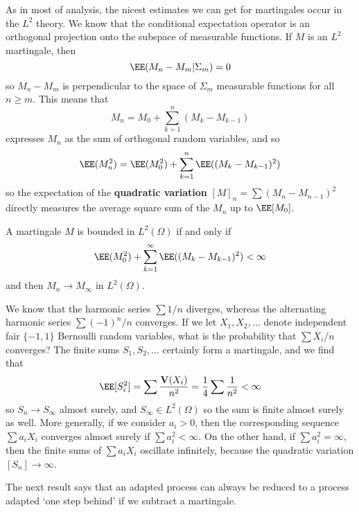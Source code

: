 As in most of analysis, the nicest estimates we can get for martingales occur in the $L^2$ theory. We know that the conditional expectation operator is an orthogonal projection onto the subspace of measurable functions. If $M$ is an $L^2$ martingale, then
%
\[ \EE(M_n - M_m | \Sigma_m) = 0 \]
%
so $M_n - M_m$ is perpendicular to the space of $\Sigma_m$ measurable functions for all $n \geq m$. This means that
%
\[ M_n = M_0 + \sum_{k = 1}^n (M_k - M_{k-1}) \]
%
expresses $M_n$ as the sum of orthogonal random variables, and so
%
\[ \EE(M_n^2) = \EE(M_0^2) + \sum_{k = 1}^n \EE((M_k - M_{k-1})^2) \]
%
so the expectation of the {\bf quadratic variation} $[M]_n = \sum (M_n - M_{n-1})^2$ directly measures the average square sum of the $M_n$ up to $\EE[M_0]$.

\begin{theorem}
    A martingale $M$ is bounded in $L^2(\Omega)$ if and only if
    \[ \EE(M_0^2) + \sum_{k = 1}^\infty \EE((M_k - M_{k-1})^2) < \infty \]
    and then $M_n \to M_\infty$ in $L^2(\Omega)$.
\end{theorem}

\begin{example}
    We know that the harmonic series $\sum 1/n$ diverges, whereas the alternating harmonic series $\sum (-1)^n/n$ converges. If we let $X_1, X_2, \dots$ denote independent fair $\{ -1, 1 \}$ Bernoulli random variables, what is the probability that $\sum X_i/n$ converges? The finite sums $S_1, S_2, \dots$ certainly form a martingale, and we find that
    \[ \EE[S_i^2] = \sum \frac{\mathbf{V}(X_i)}{n^2} = \frac{1}{4} \sum \frac{1}{n^2} < \infty \]
    so $S_n \to S_\infty$ almost surely, and $S_\infty \in L^2(\Omega)$ so the sum is finite almost surely as well. More generally, if we consider $a_i > 0$, then the corresponding sequence $\sum a_iX_i$ converges almost surely if $\sum a_i^2 < \infty$. On the other hand, if $\sum a_i^2 = \infty$, then the finite sums of $\sum a_iX_i$ oscillate infinitely, because the quadratic variation $[S_n] \to \infty$.
\end{example}

The next result says that an adapted process can always be reduced to a process adapted `one step behind' if we subtract a martingale.

